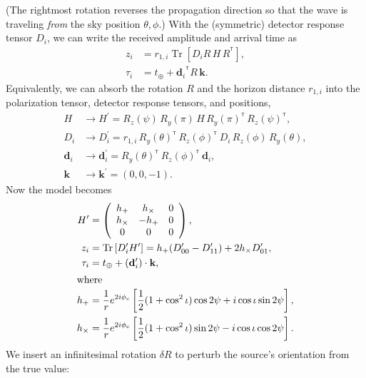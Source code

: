 \documentclass[amsmath,amssymb,aps,prx,reprint,nopreprintnumbers,nofootinbib]{revtex4-1}
\DeclareMathOperator{\Tr}{Tr}
\newcommand\transpose{\ensuremath{^{^\mathsf{T}}}}
\begin{document}
%
(The rightmost rotation reverses the propagation direction so that the wave is traveling \emph{from} the sky position $\theta, \phi$.) With the (symmetric) detector response tensor $D_i$, we can write the received amplitude and arrival time as
%
\begin{align}
    z_i &= r_{1,i} \Tr \left[ D_i R \, H \, R\transpose \right], \\
    \tau_i &= t_\oplus + {\mathbf{d}_i}\transpose R \, \mathbf{k}.
\end{align}
%
Equivalently, we can absorb the rotation $R$ and the horizon distance $r_{1,i}$ into the polarization tensor, detector response tensors, and positions,
%
\begin{align}
    H &\rightarrow H^\prime = R_z(\psi) \, R_y(\pi) \, H \, R_y(\pi)\transpose  \, R_z(\psi)\transpose, \\
    D_i &\rightarrow D_i^\prime = r_{1,i} \, R_y(\theta)\transpose \, R_z(\phi)\transpose \, D_i \, R_z(\phi) \, R_y(\theta), \\
    \mathbf{d}_i &\rightarrow \mathbf{d}_i^\prime = R_y(\theta)\transpose \, R_z(\phi)\transpose \, \mathbf{d}_i, \\
    \mathbf{k} &\rightarrow \mathbf{k}^\prime = (0, 0, -1).
\end{align}
%
Now the model becomes
%
\begin{align}
    \label{eq:H-hplus-hcross}
    H^\prime &= \left(
        \begin{array}{ccc}
            h_+ & h_\times & 0 \\
            h_\times & -h_+ & 0 \\
            0 & 0 & 0
        \end{array}
    \right), \\
    \label{eq:z-hplus-hcross}
    z_i &= \Tr \left[ D_i^\prime H^\prime \right] = h_+ (D_{00}^\prime - D_{11}^\prime) + 2 h_\times D_{01}^\prime, \\
    \tau_i &= t_\oplus + (\mathbf{d}_i^\prime) \cdot \mathbf{k}, \\
    \intertext{where}
    \label{eq:hplus}
    h_+ &= \frac{1}{r} e^{2 i \phi_c} \left[\frac{1}{2} (1+\cos^2\iota) \cos{2\psi} + i \cos\iota \sin{2\psi}\right], \\
    \label{eq:hcross}
    h_\times &= \frac{1}{r} e^{2 i \phi_c} \left[\frac{1}{2} (1+\cos^2\iota) \sin{2\psi} - i \cos\iota \cos{2\psi}\right].
\end{align}
%
We insert an infinitesimal rotation $\delta R$ to perturb the source's orientation from the true value:
\end{document}

